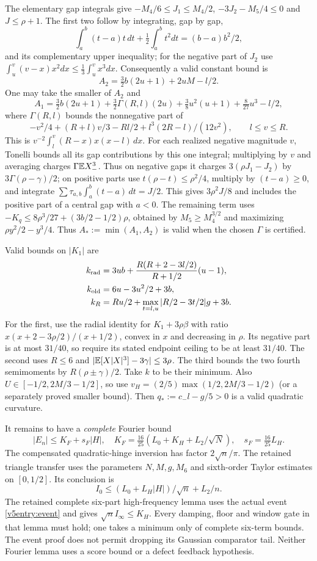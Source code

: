The elementary gap integrals give
$-M_4/6\le J_1\le M_4/2$, $-3J_2-M_5/4\le0$ and $J\le\rho+1$.
The first two follow by integrating, gap by gap,
\[
 \int_a^b(t-a)t\,dt+\tfrac12\int_a^bt^2dt=(b-a)b^2/2,
\]
and its complementary upper inequality; for the negative part of $J_2$
use $\int_u^v(v-x)x^2dx\le\tfrac13\int_u^vx^3dx$.
Consequently a valid constant bound is
\[
 A_2=\tfrac32b(2u+1)+2uM-l/2.
\]
One may take the smaller of $A_2$ and
\[
 A_1=\tfrac32b(2u+1)+\tfrac32\Gamma(R,l)(2u)
                  +\tfrac38u^2(u+1)+\tfrac8{27}u^3-l/2,
\]
where $\Gamma(R,l)$ bounds the nonnegative part of
\[
 -v^2/4+(R+l)v/3-Rl/2+l^3(2R-l)/(12v^2),\qquad l\le v\le R.
\]
This is $v^{-2}\int_l^v(R-x)x(x-l)\,dx$. For each realized negative
magnitude $v$, Tonelli bounds all its gap contributions by this one
integral; multiplying by $v$ and averaging charges $\Gamma\mathbb E X_-^3$.
Thus on negative gaps it charges
$3(\rho J_1-J_2)$ by $3\Gamma(\rho-\gamma)/2$; on positive parts use
$t(\rho-t)\le\rho^2/4$, multiply by $(t-a)\ge0$, and integrate
$\sum\tau_{a,b}\int_a^b(t-a)\,dt=J/2$. This gives $3\rho^2J/8$
and includes the positive part of a central gap with $a<0$.
The remaining term uses
$-K_q\le8\rho^3/27+(3b/2-1/2)\rho$, obtained by
$M_5\ge M_4^{3/2}$ and maximizing $\rho y^2/2-y^3/4$.
Thus $A_*:=\min(A_1,A_2)$ is valid when the chosen $\Gamma$ is certified.

Valid bounds on $|K_1|$ are
\begin{align*}
 k_{\rm rad}&=3ub+\frac{R(R+2-3l/2)}{R+1/2}(u-1),\\
 k_{\rm old}&=6u-3u^2/2+3b,\\
 k_R&=Ru/2+\max_{t=l,u}|R/2-3t/2|g+3b.
\end{align*}
For the first, use the radial identity for $K_1+3\rho\beta$ with ratio
$x(x+2-3\rho/2)/(x+1/2)$, convex in $x$ and decreasing in $\rho$.
Its negative part is at most $31/40$, so require its stated endpoint
ceiling to be at least $31/40$. The second uses $R\le6$ and
$|\mathbb E[X|X|^3]-3\gamma|\le3\rho$. The third bounds the two fourth
semimoments by $R(\rho\pm\gamma)/2$. Take $k$ to be their minimum.
Also $U\in[-1/2,2M/3-1/2]$, so use
$v_H=(2/5)\max(1/2,2M/3-1/2)$ (or a separately proved smaller bound).
Then $q_*:=c_-l-g/5>0$ is a valid quadratic curvature.

It remains to have a \emph{complete} Fourier bound
\begin{equation}\label{v5entry:fourier-input}
 |E_n|\le K_F+s_F|H|,\quad
 K_F=\tfrac{16}{25}(L_0+K_H+L_2/\sqrt N),\quad s_F=\tfrac{16}{25}L_H.
\end{equation}
The compensated quadratic-hinge inversion has factor $2\sqrt n/\pi$.
The retained triangle transfer uses the parameters $N,M,g,M_6$ and
sixth-order Taylor estimates on $[0,1/2]$. Its conclusion is
\[
 I_0\le(L_0+L_H|H|)/\sqrt n+L_2/n.
\]
The retained complete six-part high-frequency lemma uses the actual
event \eqref{v5entry:event} and gives $\sqrt n I_\infty\le K_H$.
Every damping, floor and window gate in that lemma must hold; one takes
a minimum only of complete six-term bounds. The event proof does not
permit dropping its Gaussian comparator tail. Neither Fourier lemma
uses a score bound or a defect feedback hypothesis.

